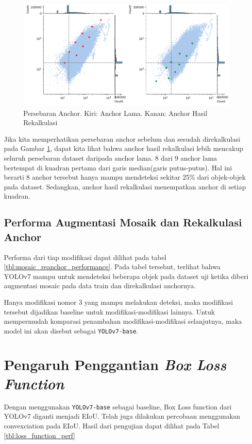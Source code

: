   
  \vspace{1ex}
  \begin{figure}[H]
    \centering
    \includegraphics[width=\textwidth]{figures/anchor-dist-2.png}
    \caption{Persebaran Anchor. Kiri: Anchor Lama. Kanan: Anchor Hasil Rekalkulasi}
    \label{fig:anchor-dist}
  \end{figure}

  Jika kita memperhatikan persebaran anchor sebelum dan sesudah direkalkulasi pada Gambar \ref{fig:anchor-dist},
  dapat kita lihat bahwa anchor hasil rekalkulasi lebih mencakup seluruh persebaran dataset daripada anchor lama.
  8 dari 9 anchor lama bertempat di kuadran pertama dari garis median(garis putus-putus).
  Hal ini berarti 8 anchor tersebut hanya mampu mendeteksi sekitar 25\% dari objek-objek pada dataset.
  Sedangkan, anchor hasil rekalkulasi menempatkan anchor di setiap kuadran.



\subsection{Performa Augmentasi Mosaik dan Rekalkulasi Anchor}
  Performa dari tiap modifikasi dapat dilihat pada tabel \ref{tbl:mosaic_reanchor_performance}.
  Pada tabel tersebut, terlihat bahwa YOLOv7 mampu untuk mendeteksi beberapa objek pada dataset uji ketika diberi 
  augmentasi mosaic pada data train dan direkalkulasi anchornya.
  

  Hanya modifikasi nomor 3 yang mampu melakukan deteksi, maka 
  modifikasi tersebut dijadikan baseline untuk modifikasi-modifikasi lainnya.
  Untuk mempermudah komparasi penambahan modifikasi-modifikasi selanjutnya,
  maka model ini akan disebut sebagai \verb*|YOLOv7-base|.

\section{Pengaruh Penggantian \emph{Box Loss Function}}
Dengan menggunakan \verb*|YOLOv7-base| sebagai baseline, 
Box Loss function dari YOLOv7 diganti menjadi EIoU.
Telah juga dilakukan percobaan menggunakan convexciation pada EIoU.
Hasil dari pengujian dapat dilihat pada Tabel \ref{tbl:loss_function_perf}

